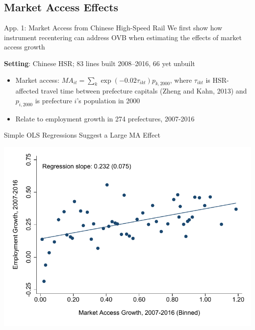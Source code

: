 \documentclass{beamer}
\begin{document}
\subsection{Market Access Effects}
\begin{frame}[label=HSRApplication]{App. 1: Market Access from Chinese High-Speed Rail}
	We first show how instrument recentering can address OVB when estimating the effects of market access growth
	
	\vspace{0.4cm}
	\textbf{Setting}: Chinese HSR; 83 lines built 2008--2016, 66 yet unbuilt
	\vspace{0.1cm}
	\begin{itemize}
	\item Market access: $MA_{i t}= \sum_k \exp\left(-0.02\tau_{i k t}\right) p_{k,2000}$, where $\tau_{i k t}$ is HSR-affected travel time between prefecture capitals (Zheng and Kahn, 2013) and $p_{i,2000}$ is prefecture $i$'s population in 2000
	\vspace{0.1cm}
	\item Relate to employment growth in 274 prefectures, 2007-2016
	\end{itemize}
\end{frame}
	

\begin{frame}{Simple OLS Regressions Suggest a Large MA Effect} 
	\begin{center}
	\includegraphics[width=\textwidth]{lecture_includes/emp_ols_binscatter.pdf}
	\end{center}
\end{frame}
\end{document}
